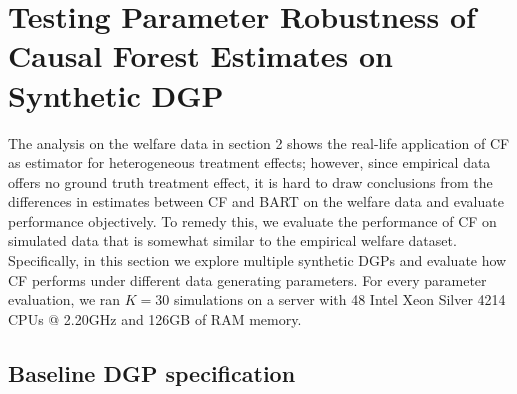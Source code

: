 \documentclass[12pt]{article}
\begin{document}
\section{Testing Parameter Robustness of Causal Forest Estimates on Synthetic DGP} 

The analysis on the welfare data in section 2 shows the real-life application of
CF as estimator for heterogeneous treatment effects; however, since empirical
data offers no ground truth treatment effect, it is hard to draw conclusions
from the differences in estimates between CF and BART on the welfare data and
evaluate performance objectively. To remedy this, we evaluate the performance of
CF on simulated data that is somewhat similar to the empirical welfare dataset.
Specifically, in this section we explore multiple synthetic DGPs and evaluate
how CF performs under different data generating parameters. For every parameter
evaluation, we ran $K=30$ simulations on a server with 48 Intel Xeon Silver 4214
CPUs @ 2.20GHz and 126GB of RAM memory.

\subsection{Baseline DGP specification} 
\end{document}
